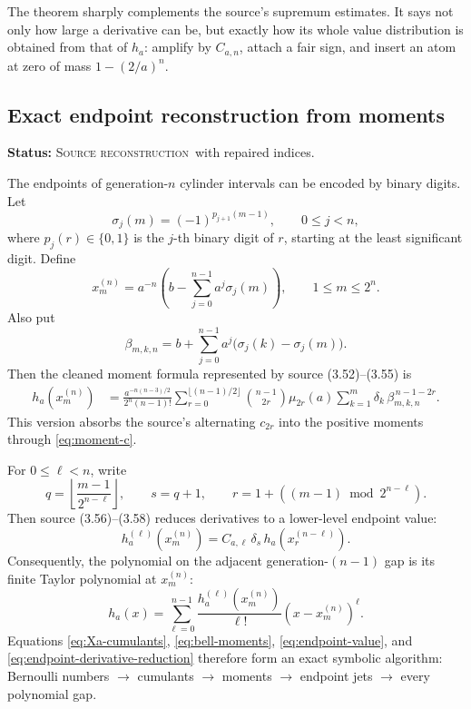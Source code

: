 \documentclass[11pt]{article}
\theoremstyle{definition}
\theoremstyle{remark}
\newcommand{\SourceStatus}{\textcolor{SourceBlue}{\textsc{Source reconstruction}}}
\newcommand{\status}[1]{\par\smallskip\noindent\textbf{Status:} #1.\par\smallskip}
\begin{document}
The theorem sharply complements the source's supremum estimates.  It says not only how large a derivative can be, but exactly how its whole value distribution is obtained from that of \(h_a\): amplify by \(C_{a,n}\), attach a fair sign, and insert an atom at zero of mass \(1-(2/a)^n\).

\subsection{Exact endpoint reconstruction from moments}
\status{\SourceStatus\ with repaired indices}

The endpoints of generation-\(n\) cylinder intervals can be encoded by binary digits.  Let
\begin{equation}
  \sigma_j(m)=(-1)^{p_{j+1}(m-1)},
  \qquad 0\le j<n,
  \label{eq:sigma-bits}
\end{equation}
where \(p_j(r)\in\{0,1\}\) is the \(j\)-th binary digit of \(r\), starting at the least significant digit.  Define
\begin{equation}
  x_m^{(n)}=a^{-n}\left(b-\sum_{j=0}^{n-1}a^j\sigma_j(m)\right),
  \qquad 1\le m\le2^n.
  \label{eq:xmn}
\end{equation}
Also put
\begin{equation}
  \beta_{m,k,n}=b+\sum_{j=0}^{n-1}a^j
   \bigl(\sigma_j(k)-\sigma_j(m)\bigr).
  \label{eq:beta-mkn}
\end{equation}
Then the cleaned moment formula represented by source (3.52)--(3.55) is
\begin{align}
 h_a(x_m^{(n)})
 &=\frac{a^{-n(n-3)/2}}{2^n(n-1)!}
 \sum_{r=0}^{\lfloor(n-1)/2\rfloor}
   \binom{n-1}{2r}\mu_{2r}(a)
   \sum_{k=1}^{m}\delta_k\,
      \beta_{m,k,n}^{\,n-1-2r}.
 \label{eq:endpoint-value}
\end{align}
This version absorbs the source's alternating \(c_{2r}\) into the positive moments through \eqref{eq:moment-c}.

For \(0\le\ell<n\), write
\begin{equation}
  q=\left\lfloor\frac{m-1}{2^{n-\ell}}\right\rfloor,
  \qquad s=q+1,
  \qquad r=1+((m-1)\bmod 2^{n-\ell}).
  \label{eq:endpoint-index-reduction}
\end{equation}
Then source (3.56)--(3.58) reduces derivatives to a lower-level endpoint value:
\begin{equation}
  h_a^{(\ell)}(x_m^{(n)})
   =C_{a,\ell}\,\delta_s\,h_a(x_r^{(n-\ell)}).
  \label{eq:endpoint-derivative-reduction}
\end{equation}
Consequently, the polynomial on the adjacent generation-\((n-1)\) gap is its finite Taylor polynomial at \(x_m^{(n)}\):
\begin{equation}
  h_a(x)=\sum_{\ell=0}^{n-1}
   \frac{h_a^{(\ell)}(x_m^{(n)})}{\ell!}
   (x-x_m^{(n)})^\ell.
  \label{eq:gap-taylor-polynomial}
\end{equation}
Equations \eqref{eq:Xa-cumulants}, \eqref{eq:bell-moments}, \eqref{eq:endpoint-value}, and \eqref{eq:endpoint-derivative-reduction} therefore form an exact symbolic algorithm: Bernoulli numbers \(\to\) cumulants \(\to\) moments \(\to\) endpoint jets \(\to\) every polynomial gap.
\end{document}
